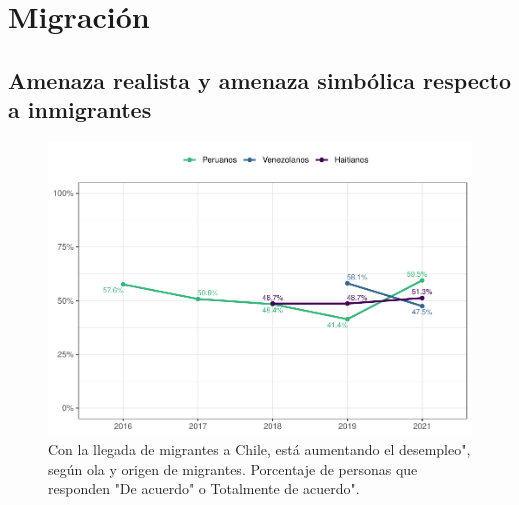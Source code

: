 \documentclass[
  12pt,
]{book}
\begin{document}
\hypertarget{migraciuxf3n}{%
\chapter{Migración}\label{migraciuxf3n}}

\hypertarget{amenaza-realista-y-amenaza-simbuxf3lica-respecto-a-inmigrantes}{%
\section{Amenaza realista y amenaza simbólica respecto a inmigrantes}\label{amenaza-realista-y-amenaza-simbuxf3lica-respecto-a-inmigrantes}}

\begin{figure}

{\centering \includegraphics{reporte-elsoc_files/figure-latex/amen1-wave-1} 

}

\caption{Con la llegada de migrantes a Chile, está aumentando el desempleo", según ola y origen de migrantes. Porcentaje de personas que responden "De acuerdo" o Totalmente de acuerdo".}\label{fig:amen1-wave}
\end{figure}
\end{document}
